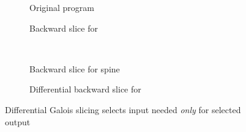 \begin{figure}
   \small
   \begin{centering}
      \begin{subfigure}{0.45\textwidth}
         {}
      \caption{Original program}
      \label{fig:example:diff-slicing:original}
      \end{subfigure}
      \begin{subfigure}{0.45\textwidth}
         {}
      \caption{Backward slice for }
      \label{fig:example:diff-slicing:subtree}
      \end{subfigure}
      \\
      \begin{subfigure}{0.45\textwidth}
         {}
      \caption{Backward slice for spine \kw{($\hole$, $\hole$)}}
      \label{fig:example:diff-slicing:spine}
      \end{subfigure}
      \begin{subfigure}{0.45\textwidth}
         {}
      \caption{Differential backward slice for }
      \label{fig:example:diff-slicing:differential}
      \end{subfigure}
   \end{centering}
   \caption{Differential Galois slicing selects input needed \emph{only} for selected output}
   \label{fig:example:diff-slicing}
\end{figure}
